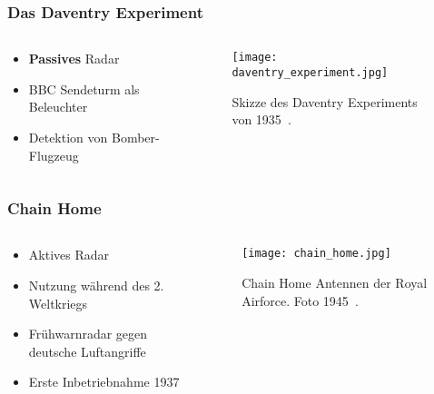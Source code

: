 \begin{frame}
    \frametitle{Das Daventry Experiment}

    \begin{columns}
        \begin{column}{0.5\textwidth}
            \begin{itemize}
                \item \textbf{Passives} Radar
                \item BBC Sendeturm als Beleuchter
                \item Detektion von Bomber-Flugzeug
            \end{itemize}
        \end{column}
        \begin{column}{0.5\textwidth}
            \begin{figure}
                \centering
                \texttt{[image: daventry\_experiment.jpg]}
                \caption{Skizze des Daventry Experiments von 1935~\cite{WattsonWatt1935}.}
            \end{figure}
        \end{column}
    \end{columns}
\end{frame}

\begin{frame}
    \frametitle{Chain Home}

    \begin{columns}
        \begin{column}{0.5\textwidth}
            \begin{itemize}
                \item Aktives Radar
                \item Nutzung während des 2. Weltkriegs
                \item Frühwarnradar gegen deutsche Luftangriffe
                \item Erste Inbetriebnahme 1937
            \end{itemize}
        \end{column}
        \begin{column}{0.5\textwidth}
            \begin{figure}
                \centering
                \texttt{[image: chain\_home.jpg]}
                \caption{Chain Home Antennen der Royal Airforce. Foto 1945~\cite{RoyalAirForce1945}.}
            \end{figure}
        \end{column}
    \end{columns}
\end{frame}

